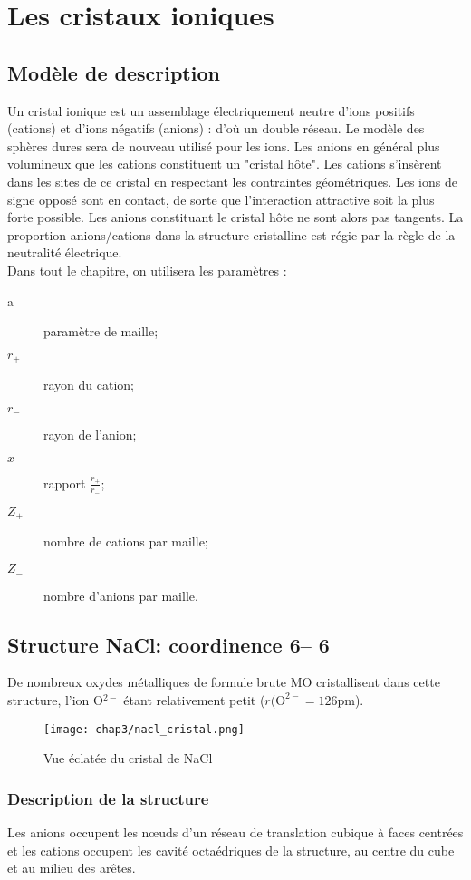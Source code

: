 \chapter{Les cristaux ioniques}
\section{Modèle de description}
Un cristal ionique est un assemblage électriquement neutre d'ions positifs (cations)
et d'ions négatifs (anions) : d'où un double réseau. Le modèle des sphères dures sera
de nouveau utilisé pour les ions.
Les anions en général plus volumineux que les cations constituent un "cristal hôte".
Les cations s’insèrent dans les sites de ce cristal en respectant les contraintes 
géométriques. Les ions de signe opposé sont en contact, de sorte que l'interaction attractive
soit la plus forte possible. Les anions constituant le cristal hôte ne sont alors 
pas tangents. La proportion anions/cations dans la structure cristalline est régie 
par la règle de la neutralité électrique.\\
Dans tout le chapitre, on utilisera les paramètres :
\begin{description}
    \item[a] paramètre de maille;
    \item[$r_+$] rayon du cation;
    \item[$r_-$] rayon de l'anion;
    \item[$x$] rapport $\frac{r_+}{r_-}$;
    \item[$Z_+$] nombre de cations par maille;
    \item[$Z_-$] nombre d'anions par maille.
\end{description}

\section{Structure NaCl: coordinence 6\--- 6}
De nombreux oxydes métalliques de formule brute MO cristallisent dans cette
structure, l'ion O$^{2-}$ étant relativement petit ($r(\text{O}^{2-} = 126$pm).

\begin{figure}
    \centering
    \texttt{[image: chap3/nacl\_cristal.png]}
    \caption{Vue éclatée du cristal de NaCl}
\end{figure}
\subsection{Description de la structure}
Les anions  occupent les n\oe uds d'un réseau de translation cubique à faces
centrées et les cations occupent les cavité octaédriques  de la structure,
au centre du cube et au milieu des arêtes.\\

